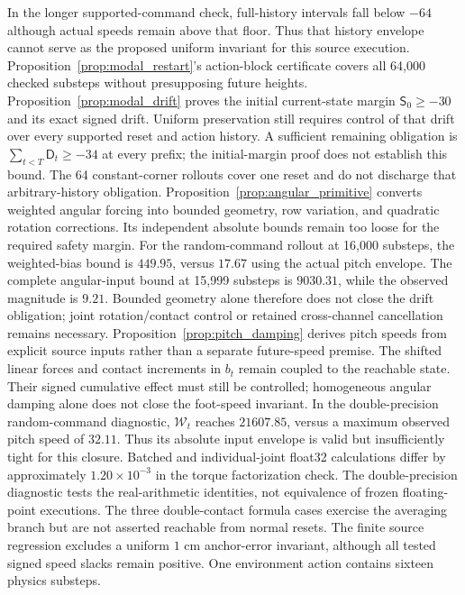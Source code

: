 In the longer supported-command check, full-history intervals fall below $-64$ although actual speeds remain above that floor.
Thus that history envelope cannot serve as the proposed uniform invariant for this source execution.
Proposition~\ref{prop:modal_restart}'s action-block certificate covers all 64,000 checked substeps without presupposing future heights.
Proposition~\ref{prop:modal_drift} proves the initial current-state margin $\mathsf S_0\ge-30$ and its exact signed drift.
Uniform preservation still requires control of that drift over every supported reset and action history.
A sufficient remaining obligation is $\sum_{t<T}\mathsf D_t\ge-34$ at every prefix; the initial-margin proof does not establish this bound.
The 64 constant-corner rollouts cover one reset and do not discharge that arbitrary-history obligation.
Proposition~\ref{prop:angular_primitive} converts weighted angular forcing into bounded geometry, row variation, and quadratic rotation corrections.
Its independent absolute bounds remain too loose for the required safety margin.
For the random-command rollout at 16,000 substeps, the weighted-bias bound is $449.95$, versus $17.67$ using the actual pitch envelope.
The complete angular-input bound at 15,999 substeps is $9030.31$, while the observed magnitude is $9.21$.
Bounded geometry alone therefore does not close the drift obligation; joint rotation/contact control or retained cross-channel cancellation remains necessary.
Proposition~\ref{prop:pitch_damping} derives pitch speeds from explicit source inputs rather than a separate future-speed premise.
The shifted linear forces and contact increments in $b_t$ remain coupled to the reachable state.
Their signed cumulative effect must still be controlled; homogeneous angular damping alone does not close the foot-speed invariant.
In the double-precision random-command diagnostic, $\mathcal W_t$ reaches $21607.85$, versus a maximum observed pitch speed of $32.11$.
Thus its absolute input envelope is valid but insufficiently tight for this closure.
Batched and individual-joint float32 calculations differ by approximately $1.20\times10^{-3}$ in the torque factorization check.
The double-precision diagnostic tests the real-arithmetic identities, not equivalence of frozen floating-point executions.
The three double-contact formula cases exercise the averaging branch but are not asserted reachable from normal resets.
The finite source regression excludes a uniform $1$ cm anchor-error invariant, although all tested signed speed slacks remain positive.
One environment action contains sixteen physics substeps.

